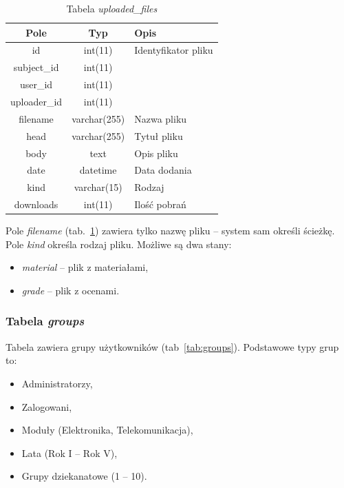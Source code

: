 \documentclass[a4paper,12pt,oneside]{report}
\begin{document}
\begin{table}[h]
  \centering
  \begin{tabular}{|c|c|l|}\hline
  Pole & Typ & Opis \\\hline
  id           & int(11)      & Identyfikator pliku\\
  subject\_id  & int(11)      & \\
  user\_id     & int(11)      & \\
  uploader\_id & int(11)      & \\
  filename     & varchar(255) & Nazwa pliku \\
  head         & varchar(255) & Tytuł pliku \\
  body         & text         & Opis pliku \\
  date         & datetime     & Data dodania \\
  kind         & varchar(15)  & Rodzaj \\
  downloads    & int(11)      & Ilość pobrań \\\hline
  \end{tabular}
  \caption{Tabela \emph{uploaded\_files}\label{tab:uploaded_files}}
\end{table}

Pole \emph{filename} (tab.~\ref{tab:uploaded_files}) zawiera tylko nazwę pliku -- system sam określi ścieżkę. Pole \emph{kind} określa rodzaj pliku. Możliwe są dwa stany:
\begin{itemize}
  \item \emph{material} -- plik z materiałami,
  \item \emph{grade} -- plik z ocenami.
\end{itemize}

\subsubsection{Tabela \emph{groups}}
\label{subsub:groups}
Tabela zawiera grupy użytkowników (tab~\ref{tab:groups}). Podstawowe typy grup to:
  \begin{itemize}
    \item Administratorzy,
    \item Zalogowani,
    \item Moduły (Elektronika, Telekomunikacja),
    \item Lata (Rok I -- Rok V),
    \item Grupy dziekanatowe (1 -- 10).
  \end{itemize}
\end{document}
